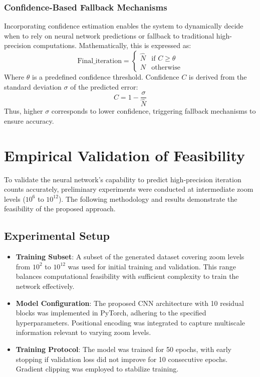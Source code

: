 \documentclass[journal]{IEEEaccess}
\begin{document}
\subsubsection{Confidence-Based Fallback Mechanisms}
Incorporating confidence estimation enables the system to dynamically decide when to rely on neural network predictions or fallback to traditional high-precision computations. Mathematically, this is expressed as:
\[
\text{Final\_iteration} =
\begin{cases}
\hat{N} & \text{if } C \geq \theta \\
N & \text{otherwise}
\end{cases}
\]
Where \( \theta \) is a predefined confidence threshold. Confidence \( C \) is derived from the standard deviation \( \sigma \) of the predicted error:
\[
C = 1 - \frac{\sigma}{\hat{N}}
\]
Thus, higher \( \sigma \) corresponds to lower confidence, triggering fallback mechanisms to ensure accuracy.

\section{Empirical Validation of Feasibility}
\label{sec:empirical_validation}
To validate the neural network's capability to predict high-precision iteration counts accurately, preliminary experiments were conducted at intermediate zoom levels (\(10^6\) to \(10^{12}\)). The following methodology and results demonstrate the feasibility of the proposed approach.

\subsection{Experimental Setup}
\begin{itemize}
    \item \textbf{Training Subset}: A subset of the generated dataset covering zoom levels from \(10^2\) to \(10^{12}\) was used for initial training and validation. This range balances computational feasibility with sufficient complexity to train the network effectively.
    
    \item \textbf{Model Configuration}: The proposed CNN architecture with 10 residual blocks was implemented in PyTorch, adhering to the specified hyperparameters. Positional encoding was integrated to capture multiscale information relevant to varying zoom levels.
    
    \item \textbf{Training Protocol}: The model was trained for 50 epochs, with early stopping if validation loss did not improve for 10 consecutive epochs. Gradient clipping was employed to stabilize training.
\end{itemize}
\end{document}
